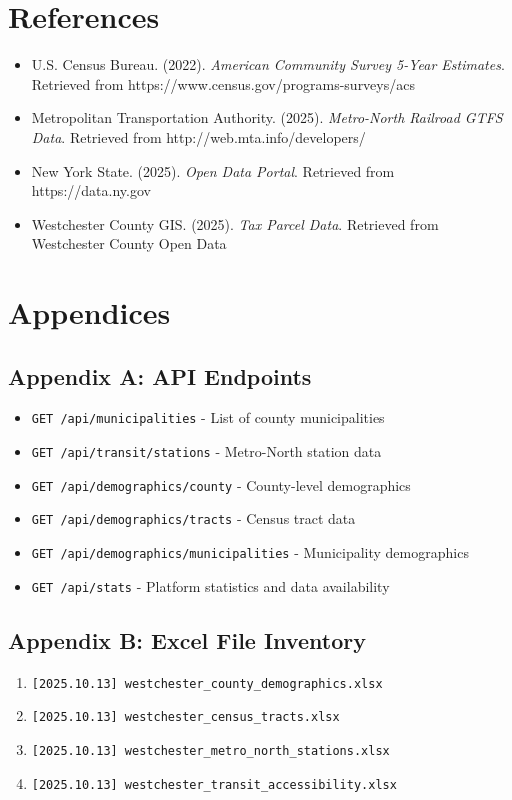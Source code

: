 \documentclass[11pt,letterpaper]{article}
\begin{document}
\section{References}

\begin{itemize}
    \item U.S. Census Bureau. (2022). \textit{American Community Survey 5-Year Estimates}. Retrieved from https://www.census.gov/programs-surveys/acs
    \item Metropolitan Transportation Authority. (2025). \textit{Metro-North Railroad GTFS Data}. Retrieved from http://web.mta.info/developers/
    \item New York State. (2025). \textit{Open Data Portal}. Retrieved from https://data.ny.gov
    \item Westchester County GIS. (2025). \textit{Tax Parcel Data}. Retrieved from Westchester County Open Data
\end{itemize}

\section{Appendices}

\subsection{Appendix A: API Endpoints}
\begin{itemize}
    \item \texttt{GET /api/municipalities} - List of county municipalities
    \item \texttt{GET /api/transit/stations} - Metro-North station data
    \item \texttt{GET /api/demographics/county} - County-level demographics
    \item \texttt{GET /api/demographics/tracts} - Census tract data
    \item \texttt{GET /api/demographics/municipalities} - Municipality demographics
    \item \texttt{GET /api/stats} - Platform statistics and data availability
\end{itemize}

\subsection{Appendix B: Excel File Inventory}
\begin{enumerate}
    \item \texttt{[2025.10.13] westchester\_county\_demographics.xlsx}
    \item \texttt{[2025.10.13] westchester\_census\_tracts.xlsx}
    \item \texttt{[2025.10.13] westchester\_metro\_north\_stations.xlsx}
    \item \texttt{[2025.10.13] westchester\_transit\_accessibility.xlsx}
\end{enumerate}
\end{document}
